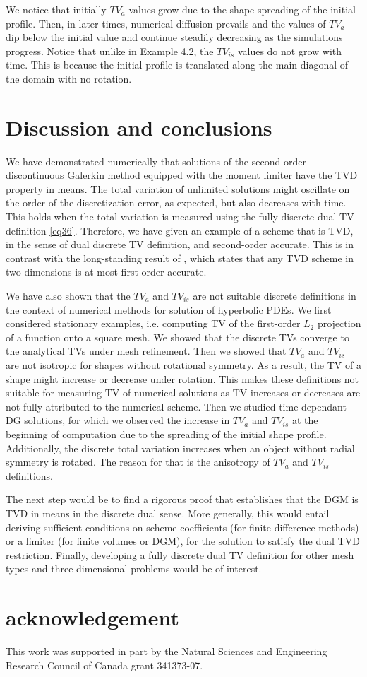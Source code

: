 \documentclass[reqno,a4paper,12pt]{amsart}
\begin{document}
We notice that initially $TV_a$ values grow due to the shape spreading of the initial profile. Then, in later times, numerical diffusion prevails and the values of $TV_a$ dip below the initial value and continue steadily decreasing as the simulations progress.  Notice that unlike in Example 4.2, the $TV_{is}$ values do not grow with time. This is because the initial profile is translated along the main diagonal of the domain with no rotation. 


\section{Discussion and conclusions}

We have demonstrated numerically that solutions of the second order discontinuous Galerkin method equipped with the moment limiter have the TVD property in means. The total variation of unlimited solutions might oscillate on the order of the discretization error, as expected, but also decreases with time. This holds when the total variation is measured using the fully discrete dual TV definition \eqref{eq36}. Therefore, we have given an example of a scheme that is TVD, in the sense of dual discrete TV definition, and second-order accurate. This is in contrast with the long-standing result of \cite{Goodman}, which states that any TVD scheme in two-dimensions is at most first order accurate. 

We have also shown that the $TV_a$ and $TV_{is}$ are not suitable discrete definitions in the context of numerical methods for solution of hyperbolic PDEs. We first considered stationary examples, i.e. computing TV of the first-order $L_2$ projection of a function onto a square mesh. We showed that the discrete TVs converge to the analytical TVs under mesh refinement. Then we showed that $TV_a$ and $TV_{is}$ are not isotropic for shapes without rotational symmetry. As a result, the TV of a shape might increase or decrease under rotation. This makes these definitions not suitable for measuring TV of numerical solutions as TV increases or decreases are not fully attributed to the numerical scheme.  
Then we studied time-dependant DG solutions, for which we observed the increase in $TV_a$ and $TV_{is}$ at the beginning of computation due to the spreading of the initial shape profile. Additionally, the discrete total variation increases when an object without radial symmetry is rotated. The reason for that is the anisotropy of $TV_a$ and $TV_{is}$ definitions. 

The next step would be to find a rigorous proof that establishes that the DGM is TVD in means in the discrete dual sense. More generally, this would entail deriving sufficient conditions on scheme coefficients (for finite-difference methods) or a limiter (for finite volumes or DGM), for the solution to satisfy the dual TVD restriction. Finally, developing a fully discrete dual TV definition for other mesh types and three-dimensional problems would be of interest.

\section{acknowledgement}
This work was supported in part by the Natural Sciences and Engineering Research Council of Canada grant 341373-07. 
\appendix



\end{document}
